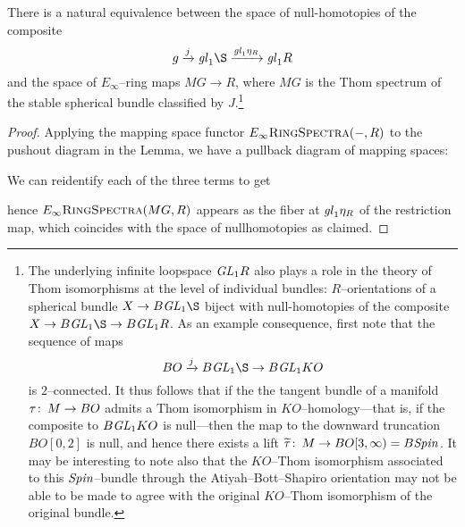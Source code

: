 \begin{corollary}
There is a natural equivalence between the space of null-homotopies of the composite \[g \xrightarrow j \gl_1 \S \xrightarrow{\gl_1 \eta_R} \gl_1 R\] and the space of \(E_\infty\)--ring maps \(MG \to R\), where \(MG\) is the Thom spectrum of the stable spherical bundle classified by \(J\).\footnote{The underlying infinite loopspace \(\mathit{GL}_1 R\) also plays a role in the theory of Thom isomorphisms at the level of individual bundles: \(R\)--orientations of a spherical bundle \(X \to B \GL_1 \S\) biject with null-homotopies of the composite \(X \to B \GL_1 \S \to B \GL_1 R\).  As an example consequence, first note that the sequence of maps \[BO \xrightarrow{j} B \GL_1 \S \to B \GL_1 KO\] is \(2\)--connected.  It thus follows that if the the tangent bundle of a manifold \(\tau\colon\thinspace M \to BO\) admits a Thom isomorphism in \(KO\)--homology---that is, if the composite to \(B \mathit{GL}_1 KO\) is null---then the map to the downward truncation \(BO[0, 2]\) is null, and hence there exists a lift \(\widetilde\tau\colon\thinspace M \to BO[3, \infty) = B\mathit{Spin}\).  It may be interesting to note also that the \(KO\)--Thom isomorphism associated to this \(\mathit{Spin}\)--bundle through the Atiyah--Bott--Shapiro orientation may not be able to be made to agree with the original \(KO\)--Thom isomorphism of the original bundle.}
\end{corollary}
\begin{proof}
Applying the mapping space functor \(E_\infty\normalfont\textsc{RingSpectra}(-, R)\) to the pushout diagram in the Lemma, we have a pullback diagram of mapping spaces:
\begin{center}
\end{center}
We can reidentify each of the three terms to get
\begin{center}
\end{center}
hence \(E_\infty\normalfont\textsc{RingSpectra}(MG, R)\) appears as the fiber at \(\mathit{gl}_1 \eta_R\) of the restriction map, which coincides with the space of nullhomotopies as claimed.
\end{proof}


